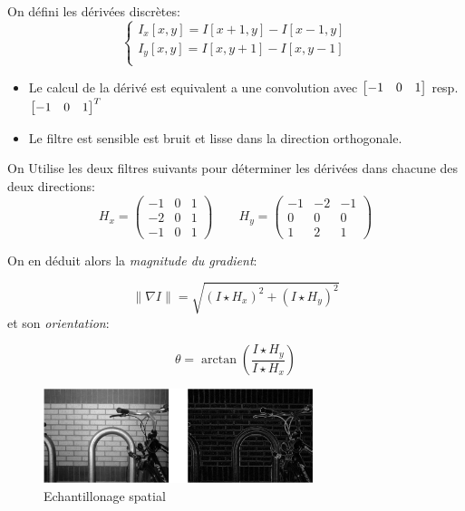 \documentclass[main.tex]{subfiles}
\begin{document}
\begin{defin}
  On défini les dérivées discrètes:
  \[
    \begin{cases}
      I_x[x,y] = I[x+1,y]-I[x-1,y]\\
      I_y[x,y] = I[x,y+1]-I[x,y-1]\\
    \end{cases}
  \]
\end{defin}
\begin{rem}
  \begin{itemize}
  \item Le calcul de la dérivé est equivalent a une convolution avec
    $\begin{bmatrix} -1 & 0 &1 \end{bmatrix}$ resp. $\begin{bmatrix} -1 & 0 &1 \end{bmatrix}^T$
  \item Le filtre est sensible est bruit et lisse dans la direction orthogonale.
\end{itemize}
\end{rem}


\begin{prop}[Sobel]
  On Utilise les deux filtres suivants pour déterminer les dérivées dans chacune des deux directions:
\[
  H_x =
  \begin{pmatrix}
    -1 & 0 &1 \\
    -2 & 0 &1\\
    -1 & 0 &1
  \end{pmatrix}
  \quad \quad
  H_y =
  \begin{pmatrix}
    -1 & -2&-1 \\
     0 & 0 & 0\\
     1 & 2 & 1
  \end{pmatrix}
\]


On en déduit alors la \emph{magnitude du gradient}:

\[
  \|\nabla I \| = \sqrt{(I\star H_x)^2+(I\star H_y)^2}
\]
et son \emph{orientation}:

\[
  \theta = \arctan( \frac{I \star H_y}{I \star H_x})
\]
\end{prop}
\begin{figure}[H]
  \centering
  \includegraphics[width=0.7\textwidth]{img/sobel_magnitude.png}
  \caption{Echantillonage spatial}
\end{figure}
\end{document}

